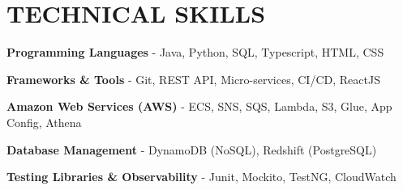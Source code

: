     \section{TECHNICAL SKILLS}

        \begin{onecolentry}
            \textbf{Programming Languages} - Java, Python, SQL, Typescript, HTML, CSS
        \end{onecolentry}

        \vspace{0.1 cm}

        \begin{onecolentry}
            \textbf{Frameworks \& Tools} - Git, REST API, Micro-services, CI/CD, ReactJS
        \end{onecolentry}

        \vspace{0.1 cm}

        \begin{onecolentry}
            \textbf{Amazon Web Services (AWS)} - ECS, SNS, SQS, Lambda, S3, Glue, App Config, Athena
        \end{onecolentry}

        \vspace{0.1 cm}

        \begin{onecolentry}
            \textbf{Database Management}  - DynamoDB \small{(NoSQL)}, Redshift \small{(PostgreSQL)}
        \end{onecolentry}

        \vspace{0.1 cm}
        
        \begin{onecolentry}
            \textbf{Testing Libraries \& Observability}  - Junit, Mockito, TestNG, CloudWatch
        \end{onecolentry}